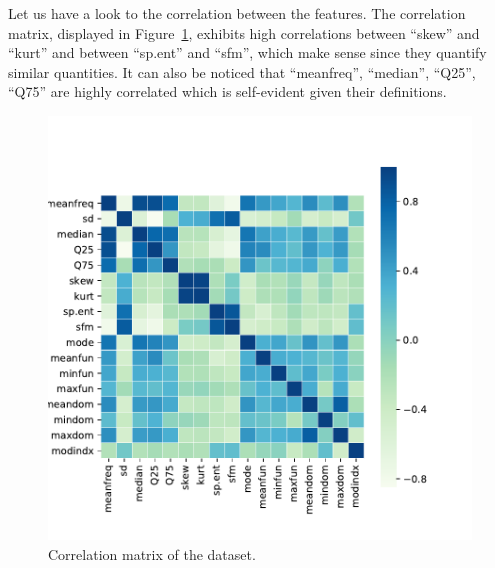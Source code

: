 Let us have a look to the correlation between the features. The correlation matrix, displayed in Figure~\ref{fig_corr_matrix}, exhibits high correlations between ``skew'' and ``kurt'' and between ``sp.ent'' and ``sfm'', which make sense since they quantify similar quantities. It can also be noticed that ``meanfreq'', ``median'', ``Q25'', ``Q75'' are highly correlated which is self-evident given their definitions. 
\newlength{\BoxPlotFigWidth}
\newlength{\BoxPlotFigHeight}
\setlength{\BoxPlotFigWidth}{0.8\textwidth}
\begin{figure}[htb]
	\centering
	\includegraphics[height=\BoxPlotFigHeight]{figures/correlation_matrix.pdf}
	\caption{Correlation matrix of the dataset.}
	\label{fig_corr_matrix}
\end{figure}

